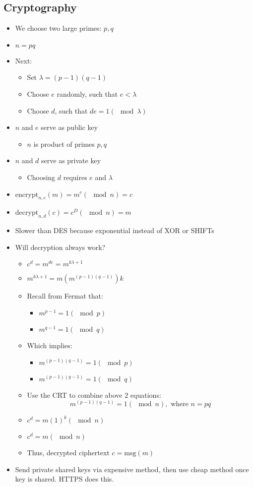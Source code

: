 \subsection{Cryptography}
\begin{itemize}
	\item We choose two large primes: $p, q$
	\item $n=pq$
	\item Next:
	\begin{itemize}
		\item Set $\lambda = (p-1)(q-1)$
		\item Choose $e$ randomly, such that $e<\lambda$
		\item Choose $d$, such that $de=1(\mod \lambda)$
	\end{itemize}
	\item $n$ and $e$ serve as public key
	\begin{itemize}
		\item $n$ is product of primes $p, q$
	\end{itemize}
	\item $n$ and $d$ serve as private key
	\begin{itemize}
		\item Choosing $d$ requires $e$ and $\lambda$
	\end{itemize}
	\item $\text{encrypt}_{n,e}(m)=m^e (\mod n)=c$
	\item $\text{decrypt}_{n,d}(c)=c^D(\mod n)= m$
	\item Slower than DES because exponential instead of XOR or SHIFTs
	\item Will decryption always work?
	\begin{itemize}
		\item $c^d = m^{de}=m^{k\lambda + 1}$
		\item $m^{k\lambda + 1}=m(m^{(p-1)(q-1)})k$
		\item Recall from Fermat that:
		\begin{itemize}
			\item $m^{p-1}=1(\mod p)$
			\item $m^{q-1}=1(\mod q)$
		\end{itemize}
		\item Which implies:
		\begin{itemize}
			\item $m^{(p-1)(q-1)}=1(\mod p)$
			\item $m^{(p-1)(q-1)}=1(\mod q)$
		\end{itemize}
		\item Use the CRT to combine above 2 equations:
			$$m^{(p-1)(q-1)}=1(\mod n),\text{ where } n=pq$$
		\item $c^d=m(1)^k(\mod n)$
		\item $c^d=m(\mod n)$
		\item Thus, decrypted ciphertext $c=\text{msg}(m)$
	\end{itemize}
	\item Send private shared keys via expensive method, then use cheap method once key is shared. HTTPS does this.
\end{itemize}